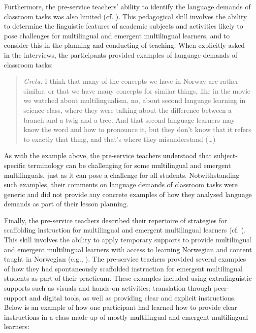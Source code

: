 \documentclass[output=paper]{langscibook}
\begin{document}
\begin{sloppypar}
Furthermore, the pre-service teachers’ ability to identify the language demands of classroom tasks was also limited (cf. \citealt{chapters/8_heikkola}). This pedagogical skill involves the ability to determine the linguistic features of academic subjects and activities likely to pose challenges for multilingual and emergent multilingual learners, and to consider this in the planning and conducting of teaching. When explicitly asked in the interviews, the participants provided examples of language demands of classroom tasks:
\end{sloppypar}

\begin{quote}
\emph{Greta:} I think that many of the concepts we have in Norway are rather similar, or that we have many concepts for similar things, like in the movie we watched about multilingualism, no, about second language learning in science class, where they were talking about the difference between a branch and a twig and a tree. And that second language learners may know the word and how to pronounce it, but they don’t know that it refers to exactly that thing, and that’s where they misunderstand (…)
\end{quote}

As with the example above, the pre-service teachers understood that subject-specific terminology can be challenging for some multilingual and emergent multilinguals, just as it can pose a challenge for all students. Notwithstanding such examples, their comments on language demands of classroom tasks were generic and did not provide any concrete examples of how they analysed language demands as part of their lesson planning. 

Finally, the pre-service teachers described their repertoire of strategies for scaffolding instruction for multilingual and emergent multilingual learners (cf. \citealt{chapters/7_alisaari, chapters/8_heikkola}). This skill involves the ability to apply temporary supports to provide multilingual and emergent multilingual learners with access to learning Norwegian and content taught in Norwegian (e.g., \citealt{LucasVillegas2013}). The pre-service teachers provided several examples of how they had spontaneously scaffolded instruction for emergent multilingual students as part of their practicum. These examples included using extralinguistic supports such as visuals and hands-on activities; translation through peer-support and digital tools, as well as providing clear and explicit instructions. Below is an example of how one participant had learned how to provide clear instructions in a class made up of mostly multilingual and emergent multilingual learners:
\end{document}
